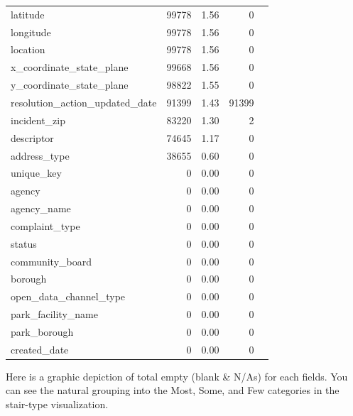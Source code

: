 \documentclass[12pt, titlepage]{article}
\begin{document}
\begin{table}[tbp]
{\begin{tabular}{lrrrl}
		latitude & 99778 & 1.56 & 0 \\
		longitude & 99778 & 1.56 & 0 \\
		location & 99778 & 1.56 & 0 \\
		x\_coordinate\_state\_plane & 99668 & 1.56 & 0 \\
		y\_coordinate\_state\_plane & 98822 & 1.55 & 0 \\
		resolution\_action\_updated\_date & 91399 & 1.43 & 91399 \\
		incident\_zip & 83220 & 1.30 & 2 \\
		descriptor & 74645 & 1.17 & 0 \\
		address\_type & 38655 & 0.60 & 0 \\
		unique\_key & 0 & 0.00 & 0 \\
		agency & 0 & 0.00 & 0 \\
		agency\_name & 0 & 0.00 & 0 \\
		complaint\_type & 0 & 0.00 & 0 \\
		status & 0 & 0.00 & 0 \\
		community\_board & 0 & 0.00 & 0 \\
		borough & 0 & 0.00 & 0 \\
		open\_data\_channel\_type & 0 & 0.00 & 0 \\
		park\_facility\_name & 0 & 0.00 & 0 \\
		park\_borough & 0 & 0.00 & 0 \\
		created\_date & 0 & 0.00 & 0 \\
	\bottomrule
\end{tabular}
}
\end{table}


Here is a graphic depiction of total empty (blank \& N/As) for each fields. You can see the natural grouping into the Most, Some, and Few categories
in the stair-type visualization. 
\end{document}
